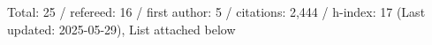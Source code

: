 Total: 25 / refereed: 16 / first author: 5 / citations: 2,444 / h-index: 17 (Last updated: 2025-05-29), List attached below